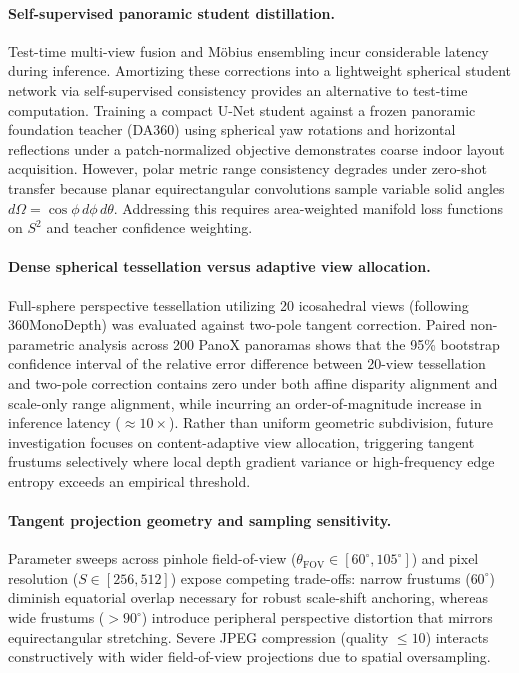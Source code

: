 \documentclass{article}
\begin{document}
\paragraph{Self-supervised panoramic student distillation.} Test-time multi-view fusion and M\"obius ensembling incur considerable latency during inference. Amortizing these corrections into a lightweight spherical student network via self-supervised consistency provides an alternative to test-time computation. Training a compact U-Net student against a frozen panoramic foundation teacher (DA360) using spherical yaw rotations and horizontal reflections under a patch-normalized objective demonstrates coarse indoor layout acquisition. However, polar metric range consistency degrades under zero-shot transfer because planar equirectangular convolutions sample variable solid angles $d\Omega = \cos\phi\,d\phi\,d\theta$. Addressing this requires area-weighted manifold loss functions on $S^2$ and teacher confidence weighting.

\paragraph{Dense spherical tessellation versus adaptive view allocation.} Full-sphere perspective tessellation utilizing 20 icosahedral views (following 360MonoDepth) was evaluated against two-pole tangent correction. Paired non-parametric analysis across 200 PanoX panoramas shows that the 95\% bootstrap confidence interval of the relative error difference between 20-view tessellation and two-pole correction contains zero under both affine disparity alignment and scale-only range alignment, while incurring an order-of-magnitude increase in inference latency ($\approx 10\times$). Rather than uniform geometric subdivision, future investigation focuses on content-adaptive view allocation, triggering tangent frustums selectively where local depth gradient variance or high-frequency edge entropy exceeds an empirical threshold.

\paragraph{Tangent projection geometry and sampling sensitivity.} Parameter sweeps across pinhole field-of-view ($\theta_{\mathrm{FOV}} \in [60^\circ, 105^\circ]$) and pixel resolution ($S \in [256, 512]$) expose competing trade-offs: narrow frustums ($60^\circ$) diminish equatorial overlap necessary for robust scale-shift anchoring, whereas wide frustums ($>90^\circ$) introduce peripheral perspective distortion that mirrors equirectangular stretching. Severe JPEG compression (quality $\le 10$) interacts constructively with wider field-of-view projections due to spatial oversampling.
\end{document}
